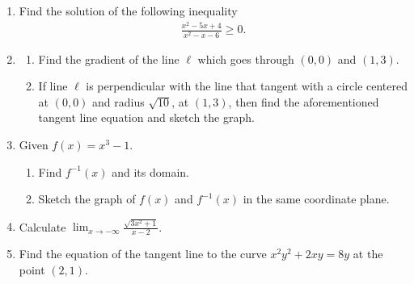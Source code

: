 \documentclass[10pt,openany,a4paper]{article}
\theoremstyle{definition}
\theoremstyle{definition}
\theoremstyle{plain}
\begin{document}
\begin{enumerate}
    \item Find the solution of the following inequality
    \begin{align*}
        \frac{x^2-5x+4}{x^2-x-6}\geq 0.
    \end{align*}

    \item \begin{enumerate}
        \item Find the gradient of the line $\ell$ which goes through $(0,0)$ and $(1,3)$.
        \item If line $\ell$ is perpendicular with the line that tangent with a circle centered at $(0,0)$ and radius $\sqrt{10}$, at $(1,3)$, then find the aforementioned tangent line equation and sketch the graph.
    \end{enumerate}

    \item Given $f(x)=x^3-1$.
    \begin{enumerate}
        \item Find $f^{-1}(x)$ and its domain.
        \item Sketch the graph of $f(x)$ and $f^{-1}(x)$ in the same coordinate plane.
    \end{enumerate}

    \item Calculate $\displaystyle\lim_{x\to-\infty}\frac{\sqrt{3x^2+1}}{x-2}$.

    \item Find the equation of the tangent line to the curve $x^2y^2+2xy=8y$ at the point $(2,1)$.
\end{enumerate}

\newpage
\end{document}

